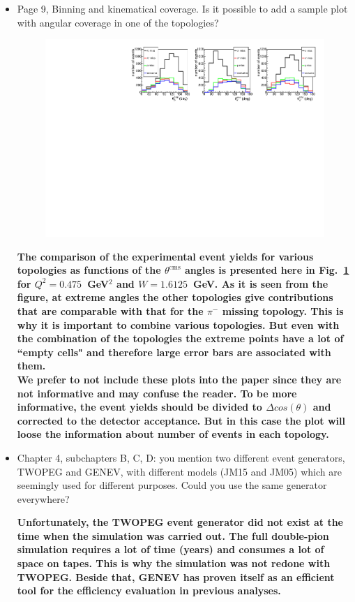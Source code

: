 \documentclass[,superscriptaddress,showpacs,amssymb,amsmath,amsfonts,linenumbers,article]{revtex4-1}
\begin{document}
\begin{itemize}
\item Page 9, Binning and kinematical coverage. Is it possible to add a sample plot with angular coverage in one of the topologies?\\
{\bf 
\begin{figure}[htp!]
\begin{center}
 \includegraphics[width=14cm,keepaspectratio]{pictures/theta_var_top.pdf}
 \caption{\label{ang_cover}}
\end{center}
\end{figure} 
}
{\bf The comparison of the experimental event yields for various topologies as functions of the $\theta^{\text{cms}}$ angles is presented here in Fig.~\ref{ang_cover} for $Q^{2} = 0.475$~GeV$^2$ and $W = 1.6125$~GeV. As it is seen from the figure, at extreme angles the other topologies give contributions that are comparable with that for the $\pi^{-}$ missing topology. This is why it is important to combine various topologies. But even with the combination of the topologies the extreme points have a lot of ``empty cells" and therefore large error bars are associated with them.\\
We prefer to not include these plots into the paper since they are not informative and may confuse the reader. To be more informative, the event yields should be divided to $\Delta cos(\theta)$ and corrected to the detector acceptance. But in this case the plot will loose the information about number of events in each topology.}



\item Chapter 4, subchapters B, C, D: you mention two different event generators, TWOPEG and GENEV, with different models (JM15 and JM05) which are seemingly used for different purposes. Could you use the same generator everywhere?\\
{\bf Unfortunately, the TWOPEG event generator did not exist at the time when the simulation was carried out. The full double-pion simulation requires a lot of time (years) and consumes a lot of space on tapes. This is why the simulation was not redone with TWOPEG. Beside that, GENEV has proven itself as an efficient tool for the efficiency evaluation in previous analyses.

}
\end{itemize}
\end{document}
